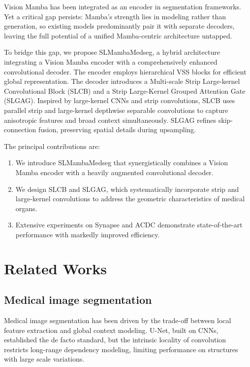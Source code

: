 \documentclass[letterpaper, 10 pt, conference]{ieeeconf}  %
\begin{document}
Vision Mamba has been integrated as an encoder in segmentation frameworks\cite{ruan2024vmunet,ma2024umamba}. Yet a critical gap persists: Mamba's strength lies in modeling rather than generation, so existing models predominantly pair it with separate decoders\cite{Smamba,MaIL}, leaving the full potential of a unified Mamba-centric architecture untapped.

To bridge this gap, we propose SLMambaMedseg, a hybrid architecture integrating a Vision Mamba encoder with a comprehensively enhanced convolutional decoder. The encoder employs hierarchical VSS blocks for efficient global representation. The decoder introduces a Multi-scale Strip Large-kernel Convolutional Block (SLCB) and a Strip Large-Kernel Grouped Attention Gate (SLGAG). Inspired by large-kernel CNNs\cite{liu2022convnext} and strip convolutions\cite{hou2020strippooling}, SLCB uses parallel strip and large-kernel depthwise separable convolutions to capture anisotropic features and broad context simultaneously. SLGAG refines skip-connection fusion, preserving spatial details during upsampling.

The principal contributions are:
\begin{enumerate}
\item We introduce SLMambaMedseg that synergistically combines a Vision Mamba encoder with a heavily augmented convolutional decoder.
\item We design SLCB and SLGAG, which systematically incorporate strip and large-kernel convolutions to address the geometric characteristics of medical organs.
\item Extensive experiments on Synapse and ACDC demonstrate state-of-the-art performance with markedly improved efficiency.
\end{enumerate}


\section{Related Works}

\subsection{Medical image segmentation}

Medical image segmentation has been driven by the trade-off between local feature extraction and global context modeling. U-Net\cite{ronneberger2015unet}, built on CNNs, established the de facto standard, but the intrinsic locality of convolution restricts long-range dependency modeling\cite{luo2016erf,wang2018nonlocal}, limiting performance on structures with large scale variations\cite{chen2021transunet}.
\end{document}
